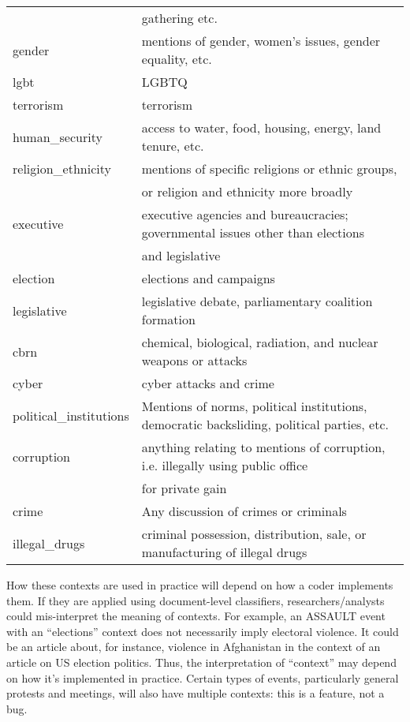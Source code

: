 \documentclass[11pt]{report}
\newcommand{\plcat}[1]{\textsf{#1}}
\begin{document}
\begin{table}[htp]
\begin{center}
\begin{tabular}{|l|l|}
&\hspace{6pt} gathering etc.\\
gender & mentions of gender, women's issues, gender equality, etc. \\
lgbt & LGBTQ \\
terrorism & terrorism \\
human\_security & access to water, food, housing, energy, land tenure, etc. \\
religion\_ethnicity & mentions of specific religions or ethnic groups,  \\&\hspace{6pt} or religion and ethnicity more broadly \\
executive & executive agencies and bureaucracies; governmental issues other than elections \\
&\hspace{6pt} and legislative \\
election & elections and campaigns \\
legislative & legislative debate, parliamentary coalition formation \\
cbrn & chemical, biological, radiation, and nuclear weapons or attacks  \\
cyber & cyber attacks and crime\\
political\_institutions & Mentions of norms, political institutions, democratic backsliding, political parties, etc. \\
corruption & anything relating to mentions of corruption, i.e. illegally using public office \\
&\hspace{6pt} for private gain \\
crime & Any discussion of crimes or criminals \\
illegal\_drugs & criminal possession, distribution, sale, or manufacturing of illegal drugs \\
\hline
\end{tabular}
\end{center}
\label{tab:context}
\end{table}

How these contexts are used in practice will depend on how a coder implements them. If they are applied using document-level classifiers, researchers/analysts could mis-interpret the meaning of contexts. For example, an \plcat{ASSAULT} event with an ``elections'' context does not necessarily imply electoral violence. It could be an article about, for instance, violence in Afghanistan in the context of an article on US election politics. Thus, the interpretation of ``context'' may depend on how it's implemented in practice. Certain types of events, particularly general protests and meetings, will also have multiple contexts: this is a feature, not a bug.
\end{document}
